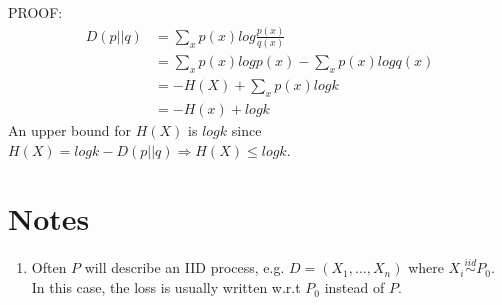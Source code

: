 \documentclass[]{article}
\begin{document}
PROOF: 
\begin{align*}
D(p||q)&=\sum_{x}p(x)log\frac{p(x)}{q(x)}\\
&=\sum_{x}p(x)logp(x)-\sum_xp(x)logq(x)\\
&= -H(X) + \sum_xp(x)logk \\
&= -H(x) + logk
\end{align*}
An upper bound for \(H(X)\) is \(logk\) since \(H(X)=logk-D(p||q) \Rightarrow H(X) \le logk \).

\newpage

\section{Notes}
\begin{enumerate}
	\item \label{sec:ft1} Often $P$ will describe an IID process, e.g. $D = (X_1,...,X_n)$ where $X_i \overset{iid}\sim P_0$. In this case, the loss is usually written w.r.t $P_0$ instead of $P$.
\end{enumerate}



\end{document}
